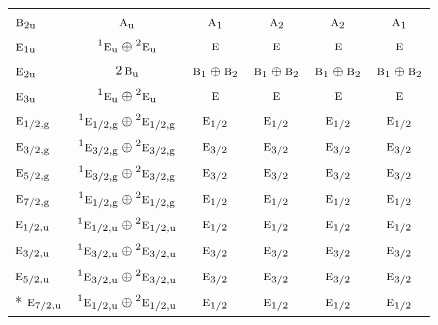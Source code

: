 \documentclass[10pt,a4paper]{article}
\numberwithin{equation}{section}
\newcommand{\irr}[1]{\text{\normalfont\scshape #1}}
\newcommand{\conjpair}[1]{{}^{#1}}
\newcommand{\ptag}[1]{\mathrm{#1}}
\begin{document}
{\begin{longtable}{@{}lccccc@{}}
$\irr{b}_{2\ptag{u}}$ & $\irr{a}_{\ptag{u}}$ & $\irr{a}_{1}$ & $\irr{a}_{2}$ & $\irr{a}_{2}$ & $\irr{a}_{1}$\\
$\irr{e}_{1\ptag{u}}$ & $\conjpair{1}\irr{e}_{\ptag{u}}\oplus \conjpair{2}\irr{e}_{\ptag{u}}$ & $\irr{e}$ & $\irr{e}$ & $\irr{e}$ & $\irr{e}$\\
$\irr{e}_{2\ptag{u}}$ & $2\,\irr{b}_{\ptag{u}}$ & $\irr{b}_{1}\oplus \irr{b}_{2}$ & $\irr{b}_{1}\oplus \irr{b}_{2}$ & $\irr{b}_{1}\oplus \irr{b}_{2}$ & $\irr{b}_{1}\oplus \irr{b}_{2}$\\
$\irr{e}_{3\ptag{u}}$ & $\conjpair{1}\irr{e}_{\ptag{u}}\oplus \conjpair{2}\irr{e}_{\ptag{u}}$ & $\irr{e}$ & $\irr{e}$ & $\irr{e}$ & $\irr{e}$\\
$\irr{e}_{1/2,\ptag{g}}$ & $\conjpair{1}\irr{e}_{1/2,\ptag{g}}\oplus \conjpair{2}\irr{e}_{1/2,\ptag{g}}$ & $\irr{e}_{1/2}$ & $\irr{e}_{1/2}$ & $\irr{e}_{1/2}$ & $\irr{e}_{1/2}$\\
$\irr{e}_{3/2,\ptag{g}}$ & $\conjpair{1}\irr{e}_{3/2,\ptag{g}}\oplus \conjpair{2}\irr{e}_{3/2,\ptag{g}}$ & $\irr{e}_{3/2}$ & $\irr{e}_{3/2}$ & $\irr{e}_{3/2}$ & $\irr{e}_{3/2}$\\
$\irr{e}_{5/2,\ptag{g}}$ & $\conjpair{1}\irr{e}_{3/2,\ptag{g}}\oplus \conjpair{2}\irr{e}_{3/2,\ptag{g}}$ & $\irr{e}_{3/2}$ & $\irr{e}_{3/2}$ & $\irr{e}_{3/2}$ & $\irr{e}_{3/2}$\\
$\irr{e}_{7/2,\ptag{g}}$ & $\conjpair{1}\irr{e}_{1/2,\ptag{g}}\oplus \conjpair{2}\irr{e}_{1/2,\ptag{g}}$ & $\irr{e}_{1/2}$ & $\irr{e}_{1/2}$ & $\irr{e}_{1/2}$ & $\irr{e}_{1/2}$\\
$\irr{e}_{1/2,\ptag{u}}$ & $\conjpair{1}\irr{e}_{1/2,\ptag{u}}\oplus \conjpair{2}\irr{e}_{1/2,\ptag{u}}$ & $\irr{e}_{1/2}$ & $\irr{e}_{1/2}$ & $\irr{e}_{1/2}$ & $\irr{e}_{1/2}$\\
$\irr{e}_{3/2,\ptag{u}}$ & $\conjpair{1}\irr{e}_{3/2,\ptag{u}}\oplus \conjpair{2}\irr{e}_{3/2,\ptag{u}}$ & $\irr{e}_{3/2}$ & $\irr{e}_{3/2}$ & $\irr{e}_{3/2}$ & $\irr{e}_{3/2}$\\
$\irr{e}_{5/2,\ptag{u}}$ & $\conjpair{1}\irr{e}_{3/2,\ptag{u}}\oplus \conjpair{2}\irr{e}_{3/2,\ptag{u}}$ & $\irr{e}_{3/2}$ & $\irr{e}_{3/2}$ & $\irr{e}_{3/2}$ & $\irr{e}_{3/2}$\\*
$\irr{e}_{7/2,\ptag{u}}$ & $\conjpair{1}\irr{e}_{1/2,\ptag{u}}\oplus \conjpair{2}\irr{e}_{1/2,\ptag{u}}$ & $\irr{e}_{1/2}$ & $\irr{e}_{1/2}$ & $\irr{e}_{1/2}$ & $\irr{e}_{1/2}$\\
\bottomrule\end{longtable}}
\end{document}

